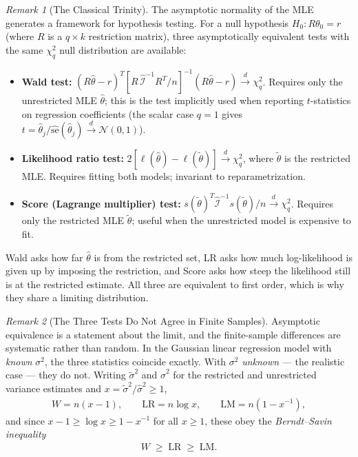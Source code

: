 \documentclass[11pt]{article}
\theoremstyle{definition}
\theoremstyle{plain}
\theoremstyle{remark}
\newtheorem{remark}{Remark}[section]
\begin{document}
\begin{remark}[The Classical Trinity]
    The asymptotic normality of the MLE generates a framework for hypothesis testing. For a null hypothesis $H_0 : R\theta_0 = r$ (where $R$ is a $q \times k$ restriction matrix), three asymptotically equivalent tests with the same $\chi^2_q$ null distribution are available:

    \begin{itemize}[noitemsep]
        \item \textbf{Wald test:} $(R\hat{\theta} - r)^T[R\,\widehat{\mathcal{I}}^{-1}R^T/n]^{-1}(R\hat{\theta}-r) \xrightarrow{d} \chi^2_q$. Requires only the unrestricted MLE $\hat{\theta}$; this is the test implicitly used when reporting $t$-statistics on regression coefficients (the scalar case $q=1$ gives $t = \hat{\theta}_j/\widehat{\mathrm{se}}(\hat{\theta}_j) \xrightarrow{d} \mathcal{N}(0,1)$).
        \item \textbf{Likelihood ratio test:} $2[\ell(\hat{\theta}) - \ell(\tilde{\theta})] \xrightarrow{d} \chi^2_q$, where $\tilde{\theta}$ is the restricted MLE. Requires fitting both models; invariant to reparametrization.
        \item \textbf{Score (Lagrange multiplier) test:} $s(\tilde{\theta})^T\widehat{\mathcal{I}}^{-1}s(\tilde{\theta})/n \xrightarrow{d} \chi^2_q$. Requires only the restricted MLE $\tilde{\theta}$; useful when the unrestricted model is expensive to fit.
    \end{itemize}

    Wald asks how far $\hat{\theta}$ is from the restricted set, LR asks how much log-likelihood is given up by imposing the restriction, and Score asks how steep the likelihood still is at the restricted estimate. All three are equivalent to first order, which is why they share a limiting distribution.
\end{remark}

\begin{remark}[The Three Tests Do Not Agree in Finite Samples]
    Asymptotic equivalence is a statement about the limit, and the finite-sample differences are systematic rather than random. In the Gaussian linear regression model with \emph{known} $\sigma^2$, the three statistics coincide exactly. With $\sigma^2$ \emph{unknown} --- the realistic case --- they do not. Writing $\tilde{\sigma}^2$ and $\hat{\sigma}^2$ for the restricted and unrestricted variance estimates and $x = \tilde{\sigma}^2/\hat{\sigma}^2 \geq 1$,
    \begin{align}
        W = n(x-1), \qquad \mathrm{LR} = n\log x, \qquad \mathrm{LM} = n(1 - x^{-1}),
    \end{align}
    and since $x - 1 \geq \log x \geq 1 - x^{-1}$ for all $x \geq 1$, these obey the \emph{Berndt--Savin inequality}
    \begin{align}
        W \;\geq\; \mathrm{LR} \;\geq\; \mathrm{LM}.
    \end{align}
\end{remark}
\end{document}
